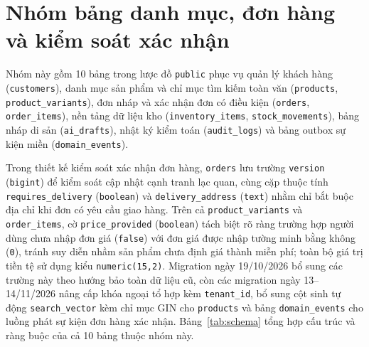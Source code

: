 \section{Nhóm bảng danh mục, đơn hàng và kiểm soát xác nhận}
Nhóm này gồm 10 bảng trong lược đồ \texttt{public} phục vụ quản lý khách hàng (\texttt{customers}), danh mục sản phẩm và chỉ mục tìm kiếm toàn văn (\texttt{products}, \texttt{product\_\hspace{0pt}variants}), đơn nháp và xác nhận đơn có điều kiện (\texttt{orders}, \texttt{order\_\hspace{0pt}items}), nền tảng dữ liệu kho (\texttt{inventory\_\hspace{0pt}items}, \texttt{stock\_\hspace{0pt}movements}), bảng nháp di sản (\texttt{ai\_\hspace{0pt}drafts}), nhật ký kiểm toán (\texttt{audit\_\hspace{0pt}logs}) và bảng outbox sự kiện miền (\texttt{domain\_\hspace{0pt}events}).

Trong thiết kế kiểm soát xác nhận đơn hàng, \texttt{orders} lưu trường \texttt{version} (\texttt{bigint}) để kiểm soát cập nhật cạnh tranh lạc quan, cùng cặp thuộc tính \texttt{requires\_\hspace{0pt}delivery} (\texttt{boolean}) và \texttt{delivery\_\hspace{0pt}address} (\texttt{text}) nhằm chỉ bắt buộc địa chỉ khi đơn có yêu cầu giao hàng. Trên cả \texttt{product\_\hspace{0pt}variants} và \texttt{order\_\hspace{0pt}items}, cờ \texttt{price\_\hspace{0pt}provided} (\texttt{boolean}) tách biệt rõ ràng trường hợp người dùng chưa nhập đơn giá (\texttt{false}) với đơn giá được nhập tường minh bằng không (\texttt{0}), tránh suy diễn nhầm sản phẩm chưa định giá thành miễn phí; toàn bộ giá trị tiền tệ sử dụng kiểu \texttt{numeric(15,2)}. Migration ngày 19/10/2026 bổ sung các trường này theo hướng bảo toàn dữ liệu cũ, còn các migration ngày 13--14/11/2026 nâng cấp khóa ngoại tổ hợp kèm \texttt{tenant\_\hspace{0pt}id}, bổ sung cột sinh tự động \texttt{search\_\hspace{0pt}vector} kèm chỉ mục GIN cho \texttt{products} và bảng \texttt{domain\_\hspace{0pt}events} cho luồng phát sự kiện đơn hàng xác nhận. Bảng~\ref{tab:schema} tổng hợp cấu trúc và ràng buộc của cả 10 bảng thuộc nhóm này.

